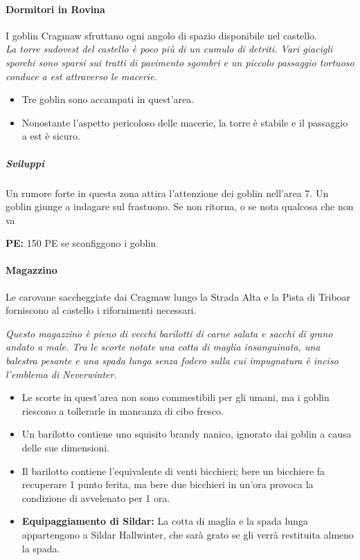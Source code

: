 \documentclass{article}
\begin{document}
\paragraph{ Dormitori in Rovina} I goblin Cragmaw sfruttano ogni angolo di spazio disponibile
nel castello. \\ 
\textit{La torre sudovest del castello è poco più di un cumulo di detriti.
Vari giacigli sporchi sono sparsi sui tratti di pavimento sgombri
e un piccolo passaggio tortuoso conduce a est attraverso le
macerie.} \\

\begin{itemize}
    \item Tre goblin sono accampati in quest'area.
    \item Nonostante l'aspetto pericoloso delle macerie, la torre è stabile e il passaggio a est è sicuro.
\end{itemize}

\subparagraph{Sviluppi}
Un rumore forte in questa zona attira l’attenzione dei goblin
nell’area 7. Un goblin giunge a indagare sul frastuono. Se non
ritorna, o se nota qualcosa che non va

\textbf{PE: } 150 PE se sconfiggono i goblin

\paragraph{ Magazzino } 
Le carovane saccheggiate dai Cragmaw lungo la
Strada Alta e la Pista di Triboar forniscono al castello i
rifornimenti necessari.

\textit{ Questo magazzino è pieno di vecchi barilotti di carne salata e
sacchi di grano andato a male. Tra le scorte notate una cotta
di maglia insanguinata, una balestra pesante e una spada
lunga senza fodero sulla cui impugnatura è inciso l'emblema
di Neverwinter. } 
\begin{itemize}
    \item Le scorte in quest'area non sono commestibili per gli umani, ma i goblin riescono a tollerarle in mancanza di cibo fresco.
    \item Un barilotto contiene uno squisito brandy nanico, ignorato dai goblin a causa delle sue dimensioni.
    \item Il barilotto contiene l'equivalente di venti bicchieri; bere un bicchiere fa recuperare 1 punto ferita, ma bere due bicchieri in un'ora provoca la condizione di avvelenato per 1 ora.
    \item \textbf{Equipaggiamento di Sildar:} La cotta di maglia e la spada lunga appartengono a Sildar Hallwinter, che sarà grato se gli verrà restituita almeno la spada.
\end{itemize}
\end{document}

